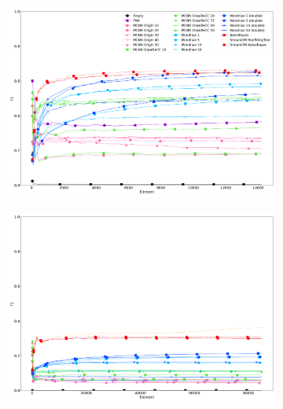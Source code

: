 \begin{figure}
	\begin{subfigure}[t]{.49\linewidth}
		\includegraphics[width=\linewidth]{figures/results/banos_6_f1.png}
		\caption{\banosdataset}
		\label{fig:f1-banos}
	\end{subfigure}
	\hfill
	\begin{subfigure}[t]{.49\linewidth}
		\includegraphics[width=\linewidth]{figures/results/recofit_6_f1.png}
		\caption{\recofitdataset}
		\label{fig:f1-recofit}
	\end{subfigure}\\
	\begin{subfigure}[t]{.49\linewidth}

\end{subfigure}
\end{figure}
